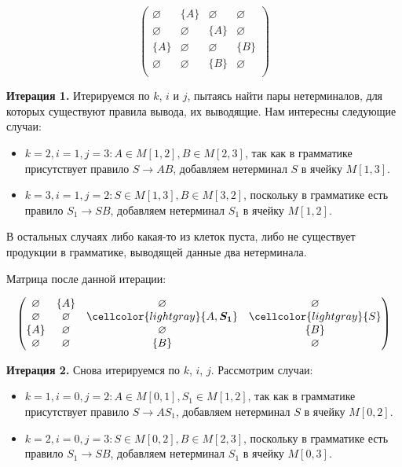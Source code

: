 \begin{example}
\[
\begin{pmatrix}
\varnothing & \{A\}       & \varnothing & \varnothing \\
\varnothing & \varnothing & \{A\}       & \varnothing \\
\{A\}       & \varnothing & \varnothing & \{B\}       \\
\varnothing & \varnothing & \{B\}       & \varnothing \\
\end{pmatrix}
\]

\textbf{Итерация 1.}
Итерируемся по $k$, $i$ и $j$, пытаясь найти пары нетерминалов, для которых существуют правила вывода, их выводящие. Нам интересны следующие случаи:

\begin{itemize}
    \item $k = 2, i = 1, j = 3: A \in M[1, 2], B \in M[2, 3]$, так как в грамматике присутствует правило $S \to A B$, добавляем нетерминал $S$ в ячейку $M[1, 3]$.
    \item $k = 3, i = 1, j = 2: S \in M[1, 3], B \in M[3, 2]$, поскольку в грамматике есть правило $S_1 \to S B$, добавляем нетерминал $S_1$ в ячейку $M[1, 2]$.
\end{itemize}

В остальных случаях либо какая-то из клеток пуста, либо не существует продукции в грамматике, выводящей данные два нетерминала.

Матрица после данной итерации:

\[
\begin{pmatrix}
\varnothing & \{A\}       & \varnothing & \varnothing \\
\varnothing & \varnothing & \cellcolor{lightgray}\{A, \boldsymbol{S_1}\}  & \cellcolor{lightgray}\{S\}       \\
\{A\}       & \varnothing & \varnothing & \{B\}       \\
\varnothing & \varnothing & \{B\}       & \varnothing \\
\end{pmatrix}
\]

\textbf{Итерация 2.}
Снова итерируемся по $k$, $i$, $j$. Рассмотрим случаи:

\begin{itemize}
    \setlength\itemsep{1em}
    \item $k = 1, i = 0, j = 2: A \in M[0, 1], S_1 \in M[1, 2]$, так как в грамматике присутствует правило $S \to A S_1$, добавляем нетерминал $S$ в ячейку $M[0, 2]$.
    \item $k = 2, i = 0, j = 3: S \in M[0, 2], B \in M[2, 3]$, поскольку в грамматике есть правило $S_1 \to S B$, добавляем нетерминал $S_1$ в ячейку $M[0, 3]$.
\end{itemize}


\end{example}
